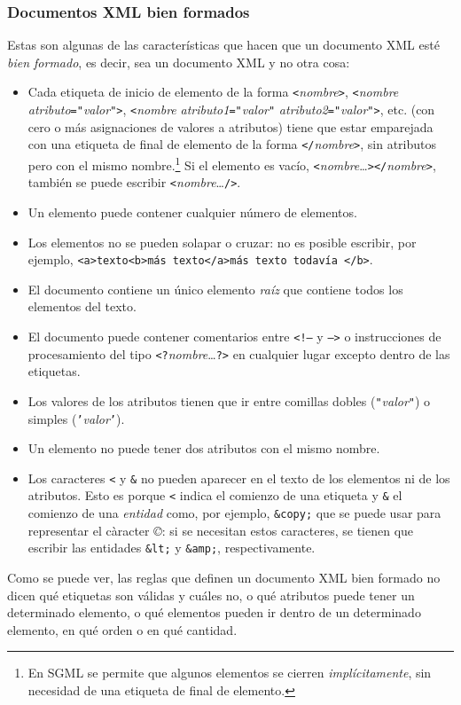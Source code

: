 \subsubsection{Documentos XML bien formados} Estas son algunas de las características que hacen que un documento XML esté \emph{bien formado}, es decir, sea un documento XML y no otra cosa: \begin{itemize} \item Cada etiqueta de inicio de elemento de la forma \texttt{<}\emph{nombre}\texttt{>}, \texttt{<}\emph{nombre} \emph{atributo}\texttt{=}\texttt{"}\emph{valor}\texttt{"}\texttt{>}, \texttt{<}\emph{nombre} \emph{atributo1}\texttt{=}\texttt{"}\emph{valor}\texttt{"} \emph{atributo2}\texttt{=}\texttt{"}\emph{valor}\texttt{"}\texttt{>}, etc. (con cero o más asignaciones de valores a atributos) tiene que estar emparejada con una etiqueta de final de elemento de la forma \texttt{</}\emph{nombre}\texttt{>}, sin atributos pero con el mismo nombre.\footnote{En SGML se permite que algunos elementos se cierren \emph{implícitamente}, sin necesidad de una etiqueta de final de elemento.} Si el elemento es vacío, \texttt{<}\emph{nombre}\ldots\texttt{></}\emph{nombre}\texttt{>}, también se puede escribir \texttt{<}\emph{nombre}\ldots\texttt{/>}. \item Un elemento puede contener cualquier número de elementos. \item Los elementos no se pueden solapar o cruzar: no es posible escribir, por ejemplo, \texttt{<a>texto<b>más texto</a>más texto todavía </b>}. \item El documento contiene un único elemento \emph{raíz} que contiene todos los elementos del texto. \item El documento puede contener comentarios entre \texttt{<!--} y \texttt{-->} o instrucciones de procesamiento del tipo \texttt{<?}\emph{nombre}\ldots\texttt{?>} en cualquier lugar excepto dentro de las etiquetas. \item Los valores de los atributos tienen que ir entre comillas dobles (\texttt{"}\emph{valor}\texttt{"}) o simples (\texttt{'}\emph{valor}\texttt{'}). \item Un elemento no puede tener dos atributos con el mismo nombre. \item Los caracteres \texttt{<} y \texttt{\&} no pueden aparecer en el texto de los elementos ni de los atributos. Esto es porque \texttt{<} indica el comienzo de una etiqueta y \texttt{\&} el comienzo de una \emph{entidad} como, por ejemplo, \texttt{\&copy;} que se puede usar para representar el càracter \emph{©}: si se necesitan estos caracteres, se tienen que escribir las entidades \texttt{\&lt;} y \texttt{\&amp;}, respectivamente. \end{itemize} Como se puede ver, las reglas que definen un documento XML bien formado no dicen qué etiquetas son válidas y cuáles no, o qué atributos puede tener un determinado elemento, o qué elementos pueden ir dentro de un determinado elemento, en qué orden o en qué cantidad. 

